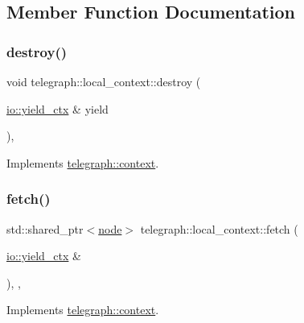 \subsection{Member Function Documentation}
\mbox{\label{classtelegraph_1_1local__context_a301da16810636030a5098e4838587a99}} 
\subsubsection{\texorpdfstring{destroy()}{destroy()}}
{\footnotesize\ttfamily void telegraph\+::local\+\_\+context\+::destroy (\begin{DoxyParamCaption}\item[{\hyperlink{structboost_1_1asio_1_1yield__ctx}{io\+::yield\+\_\+ctx} \&}]{yield }\end{DoxyParamCaption})\hspace{0.3cm}{\ttfamily [override]}, {\ttfamily [virtual]}}



Implements \hyperlink{classtelegraph_1_1context_a4017c1bcd9c84170a5cb612ae45d6fb4}{telegraph\+::context}.

\mbox{\label{classtelegraph_1_1local__context_aefadafdf25e6f6ba23c4b332872836e2}} 
\subsubsection{\texorpdfstring{fetch()}{fetch()}}
{\footnotesize\ttfamily std\+::shared\+\_\+ptr$<$\hyperlink{classtelegraph_1_1node}{node}$>$ telegraph\+::local\+\_\+context\+::fetch (\begin{DoxyParamCaption}\item[{\hyperlink{structboost_1_1asio_1_1yield__ctx}{io\+::yield\+\_\+ctx} \&}]{ }\end{DoxyParamCaption})\hspace{0.3cm}{\ttfamily [inline]}, {\ttfamily [override]}, {\ttfamily [virtual]}}



Implements \hyperlink{classtelegraph_1_1context_aa2c0321629f2d51c8bc5632e418b305f}{telegraph\+::context}.



